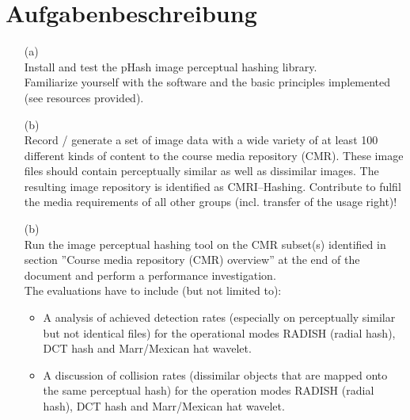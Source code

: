 \section{Aufgabenbeschreibung}
\label{sec:appendix_a}
\begin{enumerate}
	\item[\bold (a)] \\
	Install and test the pHash image perceptual hashing library.\\
	Familiarize yourself with the software and the basic principles implemented (see resources provided).	%
	\item[\bold (b)] \\
	Record / generate a set of image data with a wide variety of at least 100 different kinds of content to the course
	media repository (CMR). These image files should contain perceptually similar as well as dissimilar images. The
	resulting image repository is identified as CMR{I--Hashing}. Contribute to fulfil the media requirements of all
	other groups (incl. transfer of the usage right)!
	\item[\bold (b)] \\
	Run the image perceptual hashing tool on the CMR subset(s) identified in section ''Course media repository (CMR)
	overview'' at the end of the document and perform a performance investigation.\\
	The evaluations have to include (but not limited to):
	\begin{itemize}[noitemsep]
		\item A analysis of achieved detection rates (especially on perceptually similar but not identical files)
		for the operational modes RADISH (radial hash), DCT hash and Marr/Mexican hat wavelet.
		\item A discussion of collision rates (dissimilar objects that are mapped onto the same perceptual hash)
		for the operation modes RADISH (radial hash), DCT hash and Marr/Mexican hat wavelet.

\end{itemize}
\end{enumerate}
